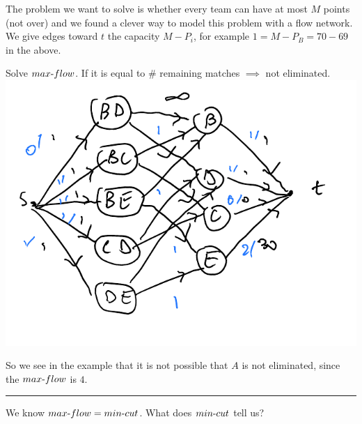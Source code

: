 \documentclass[12 pt]{article}
\begin{document}
        The problem we want to solve is whether every team can have at
        most $M$ points (not over) and we found a clever way to model
        this problem with a flow network. We give edges toward $t$ the
        capacity $M-P_i$, for example $1=M-P_B =
        70-69$ in the above.

        Solve $max\hbox{-}flow$. If it is equal to \# remaining
        matches $\implies$ not eliminated.
        \\ \includegraphics[width=.9\textwidth]{i88.pdf}

        So we see in the example that it is not possible that $A$ is
        not eliminated, since the $max\hbox{-}flow$ is $4$.
        \\ \noindent \rule{\textwidth}{0.5pt}
        We know $max\hbox{-}flow=min\hbox{-}cut$. What does
        $min\hbox{-}cut$ tell us?
\end{document}
